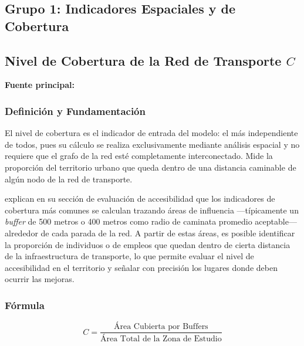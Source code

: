 \subsection*{Grupo 1: Indicadores Espaciales y de Cobertura}

\subsection{Nivel de Cobertura de la Red de Transporte \texorpdfstring{$C$}{C}}
\label{subsec:indicador-cobertura}

\textbf{Fuente principal:} \textcite{fortin2016innovative}

\subsubsection{Definición y Fundamentación}

El nivel de cobertura es el indicador de entrada del modelo: el más independiente
de todos, pues su cálculo se realiza exclusivamente mediante análisis espacial y no
requiere que el grafo de la red esté completamente interconectado. Mide la
proporción del territorio urbano que queda dentro de una distancia caminable de
algún nodo de la red de transporte.

\textcite{fortin2016innovative} explican en su sección de evaluación de accesibilidad que los
indicadores de cobertura más comunes se calculan trazando áreas de influencia
---típicamente un \textit{buffer} de 500 metros o 400 metros como radio de caminata
promedio aceptable--- alrededor de cada parada de la red. A partir de estas áreas,
es posible identificar la proporción de individuos o de empleos que quedan dentro
de cierta distancia de la infraestructura de transporte, lo que permite evaluar el nivel
de accesibilidad en el territorio y señalar con precisión los lugares donde deben
ocurrir las mejoras.

\subsubsection{Fórmula}

\begin{equation}
    C = \frac{\text{Área Cubierta por Buffers}}{\text{Área Total de la Zona de Estudio}}
    \label{eq:cobertura}
\end{equation}


